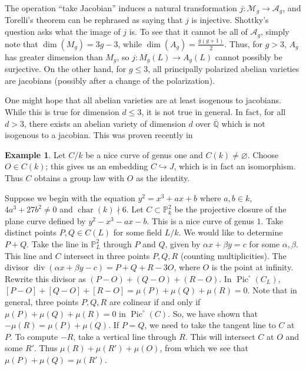 \documentclass{article}
\DeclareMathOperator{\pic}{Pic}
\theoremstyle{definition}
\newtheorem{example}[subsection]{Example}
\begin{document}
The operation ``take Jacobian'' induces a natural transformation 
$j:\mathcal{M}_g\to\mathcal{A}_g$, and Torelli's theorem can be rephrased as 
saying that $j$ is injective. Shottky's question asks what the image of $j$ is. 
To see that it cannot be all of $\mathcal{A}_g$, simply note that 
$\dim(M_g) = 3 g - 3$, while $\dim(A_g) = \frac{g(g+1)}{2}$. Thus, for 
$g>3$, $A_g$ has greater dimension than $M_g$, so $j:M_g(L)\to A_g(L)$ cannot 
possibly be surjective. On the other hand, for $g\leqslant 3$, all principally 
polarized abelian varieties are jacobians (possibly after a change of the 
polarization). 

One might hope that all abelian varieties are at least isogenous to jacobians. 
While this is true for dimension $d\leqslant 3$, it is not true in general. 
In fact, for all $d>3$, there exists an abelian variety of dimension $d$ over 
$\overline{\mathbb{Q}}$ which is not isogenous to a jacobian. This was proven 
recently in \cite{ts12}

\begin{example}
Let $C/k$ be a nice curve of genus one and $C(k)\ne\varnothing$. Choose 
$O\in C(k)$; this gives us an embedding $C\hookrightarrow J$, which is in fact 
an isomorphism. Thus $C$ obtains a group law with $O$ as the identity. 

Suppose we begin with the equation $y^2=x^3 + a x+b$ where $a,b\in k$, 
$4 a^3+27 b^2\ne 0$ and $\operatorname{char}(k)\nmid 6$. Let 
$C\subset \mathbb{P}_k^2$ be the projective closure of the plane curve defined 
by $y^2-x^3-a x-b$. This is a nice curve of genus $1$. Take distinct points 
$P,Q\in C(L)$ for some field $L/k$. We would like to determine $P+Q$. Take the 
line in $\mathbb{P}_L^2$ through $P$ and $Q$, given by $\alpha x+\beta y = c$ 
for some $\alpha,\beta$. This line and $C$ intersect in three points $P,Q,R$ 
(counting multiplicities). The divisor 
$\operatorname{div}(\alpha x+\beta y - c) = P+Q+R - 3 O$, where $O$ is the 
point at infinity. Rewrite this divisor as $(P-O)+(Q-O)+(R-O)$. In 
$\pic^\circ(C_L)$, $[P-O] + [Q-O] + [R-O] = \mu(P)+\mu(Q)+\mu(R) = 0$. Note 
that in general, three points $P,Q,R$ are colinear if and only if 
$\mu(P)+\mu(Q)+\mu(R) = 0$ in $\pic^\circ(C)$. So, we have shown that 
$-\mu(R) = \mu(P)+\mu(Q)$. If $P=Q$, we need to take the tangent line to $C$ at 
$P$. To compute $-R$, take a vertical line through $R$. This will intersect 
$C$ at $O$ and some $R'$. Thus $\mu(R)+\mu(R')+\mu(O)$, from which we see that 
$\mu(P)+\mu(Q) = \mu(R')$. 
\end{example}














\end{document}
